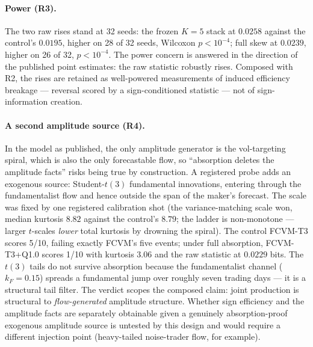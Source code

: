 \documentclass[11pt]{article}
\newcommand{\cfg}[1]{\mbox{#1}}
\begin{document}
\paragraph{Power (R3).}
The two raw rises stand at 32 seeds: the frozen $K{=}5$ stack at
$0.0258$ against the control's $0.0195$, higher on 28 of 32 seeds,
Wilcoxon $p < 10^{-4}$; full skew at $0.0239$, higher on 26 of 32,
$p < 10^{-4}$. The power concern is answered in the direction of the
published point estimates: the raw statistic robustly rises. Composed
with R2, the rises are retained as well-powered measurements of induced
efficiency breakage --- reversal scored by a sign-conditioned statistic
--- not of sign-information creation.

\paragraph{A second amplitude source (R4).}
In the model as published, the only amplitude generator is the
vol-targeting spiral, which is also the only forecastable flow, so
``absorption deletes the amplitude facts'' risks being true by
construction. A registered probe adds an exogenous source:
Student-$t(3)$ fundamental innovations, entering through the
fundamentalist flow and hence outside the span of the maker's forecast.
The scale was fixed by one registered calibration shot (the
variance-matching scale won, median kurtosis $8.82$ against the
control's $8.79$; the ladder is non-monotone --- larger $t$-scales
\emph{lower} total kurtosis by drowning the spiral). The control
\cfg{FCVM-T3} scores 5/10, failing exactly \cfg{FCVM}'s five events;
under full absorption, \cfg{FCVM-T3+Q1.0} scores 1/10 with kurtosis
$3.06$ and the raw statistic at $0.0229$ bits. The $t(3)$ tails do not
survive absorption because the fundamentalist channel ($k_F = 0.15$)
spreads a fundamental jump over roughly seven trading days --- it is a
structural tail filter. The verdict scopes the composed claim: joint
production is structural to \emph{flow-generated} amplitude structure.
Whether sign efficiency and the amplitude facts are separately
obtainable given a genuinely absorption-proof exogenous amplitude source
is untested by this design and would require a different injection point
(heavy-tailed noise-trader flow, for example).
\end{document}
